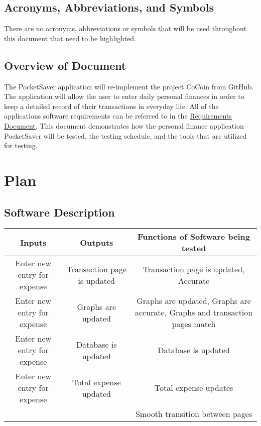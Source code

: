 \documentclass[12pt, titlepage]{article}
\begin{document}
\subsection{Acronyms, Abbreviations, and Symbols}
There are no acronyms, abbreviations or symbols that will be used throughout this document that need to be highlighted. 
	
\subsection{Overview of Document}
The PocketSaver application will re-implement the project CoCoin from GitHub. The application will allow the user to enter daily personal finances in order to keep a detailed record of their transactions in everyday life. All of the applications software requirements can be referred to in the \href{run:../SRS/SRS.pdf}{Requirements Document}. This document demonstrates how the personal finance application PocketSaver will be tested, the testing schedule, and the tools that are utilized for testing.

\section{Plan}
	
\subsection{Software Description}

\begin{center}
\begin{adjustbox}{width=\textwidth,totalheight=\textheight,keepaspectratio}
\begin{tabular}{ |c| c| c| }
\hline
Inputs & Outputs & Functions of Software being tested \\ 
\hline
 Enter new entry for expense & Transaction page is updated & Transaction page is updated, Accurate\\ 
 \hline
Enter new entry for expense & Graphs are updated & Graphs are updated, Graphs are accurate, Graphs and transaction pages match\\
\hline
Enter new entry for expense& Database is updated & Database is updated \\ 
\hline
Enter new entry for expense& Total expense updated & Total expense updates \\ 
\hline
&  &Smooth transition between pages \\ 
\hline
\end{tabular}
\end{adjustbox}

\end{center}
\end{document}
